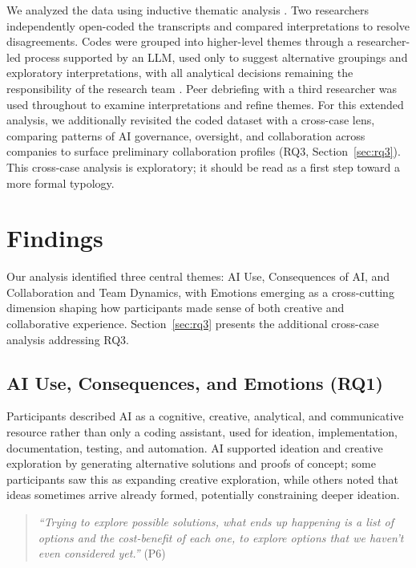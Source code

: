 \documentclass[10pt,journal,compsoc]{IEEEtran}
\begin{document}
We analyzed the data using inductive thematic analysis \cite{braun2006}. Two researchers independently open-coded the transcripts and compared interpretations to resolve disagreements. Codes were grouped into higher-level themes through a researcher-led process supported by an LLM, used only to suggest alternative groupings and exploratory interpretations, with all analytical decisions remaining the responsibility of the research team \cite{bano2024,trinkenreich2025}. Peer debriefing with a third researcher was used throughout to examine interpretations and refine themes. For this extended analysis, we additionally revisited the coded dataset with a cross-case lens, comparing patterns of AI governance, oversight, and collaboration across companies to surface preliminary collaboration profiles (RQ3, Section~\ref{sec:rq3}). This cross-case analysis is exploratory; it should be read as a first step toward a more formal typology.

\section{Findings}

Our analysis identified three central themes: AI Use, Consequences of AI, and Collaboration and Team Dynamics, with Emotions emerging as a cross-cutting dimension shaping how participants made sense of both creative and collaborative experience. Section~\ref{sec:rq3} presents the additional cross-case analysis addressing RQ3.

\subsection{AI Use, Consequences, and Emotions (RQ1)}

Participants described AI as a cognitive, creative, analytical, and communicative resource rather than only a coding assistant, used for ideation, implementation, documentation, testing, and automation. AI supported ideation and creative exploration by generating alternative solutions and proofs of concept; some participants saw this as expanding creative exploration, while others noted that ideas sometimes arrive already formed, potentially constraining deeper ideation.

\begin{quote}
\textit{``Trying to explore possible solutions, what ends up happening is a list of options and the cost-benefit of each one, to explore options that we haven't even considered yet.''} (P6)
\end{quote}
\end{document}

